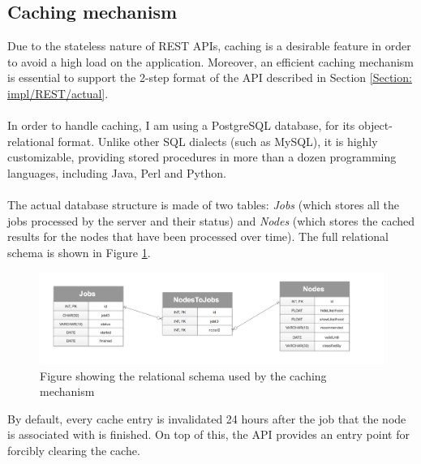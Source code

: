 	\subsection{Caching mechanism} \label{Section: impl/REST/caching}
	Due to the stateless nature of REST APIs, caching is a desirable feature in order to avoid a high load on the application. Moreover, an efficient caching mechanism is essential to support the 2-step format of the API described in Section \ref{Section: impl/REST/actual}. 
	\\ \\
	In order to handle caching, I am using a PostgreSQL database, for its object-relational format. Unlike other SQL dialects (such as MySQL), it is highly customizable, providing stored procedures in more than a dozen programming languages, including Java, Perl and Python. 
	\\ \\
	The actual database structure is made of two tables: \textit{Jobs} (which stores all the jobs processed by the server and their status) and \textit{Nodes} (which stores the cached results for the nodes that have been processed over time). The full relational schema is shown in Figure \ref{Fig: impl/REST/cache/relational}.
	\begin{figure}[H]
		\centering
		\includegraphics[width=.7\textwidth]{graphics/cache-schema}
		\caption[Cache schema]{Figure showing the relational schema used by the caching mechanism}
		\label{Fig: impl/REST/cache/relational}
	\end{figure}
	By default, every cache entry is invalidated 24 hours after the job that the node is associated with is finished. On top of this, the API provides an entry point for forcibly clearing the cache. 
	
